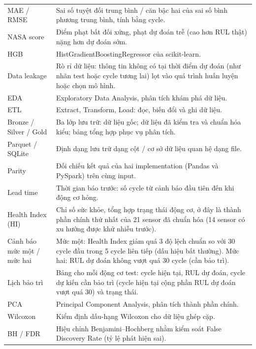 \begin{footnotesize}
\begin{longtable}{L{3.6cm}L{10.2cm}}
MAE / RMSE & Sai số tuyệt đối trung bình / căn bậc hai của sai số bình phương trung bình, tính bằng cycle.\\
NASA score & Điểm phạt bất đối xứng, phạt dự đoán trễ (cao hơn RUL thật) nặng hơn dự đoán sớm.\\
HGB & HistGradientBoostingRegressor của scikit-learn.\\
Data leakage & Rò rỉ dữ liệu: thông tin không có tại thời điểm dự đoán (như nhãn test hoặc cycle tương lai) lọt vào quá trình huấn luyện hoặc chọn mô hình.\\
EDA & Exploratory Data Analysis, phân tích khám phá dữ liệu.\\
ETL & Extract, Transform, Load: đọc, biến đổi và ghi dữ liệu.\\
Bronze / Silver / Gold & Ba lớp lưu trữ: dữ liệu gốc; dữ liệu đã kiểm tra và chuẩn hóa kiểu; bảng tổng hợp phục vụ phân tích.\\
Parquet / SQLite & Định dạng lưu trữ dạng cột / cơ sở dữ liệu quan hệ dạng file.\\
Parity & Đối chiếu kết quả của hai implementation (Pandas và PySpark) trên cùng input.\\
Lead time & Thời gian báo trước: số cycle từ cảnh báo đầu tiên đến khi động cơ hỏng.\\
Health Index (HI) & Chỉ số sức khỏe, tổng hợp trạng thái động cơ, ở đây là thành phần chính thứ nhất của 21 sensor đã chuẩn hóa (14 sensor có xu hướng được khử nhiễu trước).\\
Cảnh báo mức một / mức hai & Mức một: Health Index giảm quá 3 độ lệch chuẩn so với 30 cycle đầu trong 5 cycle liên tiếp (dấu hiệu bất thường). Mức hai: RUL dự đoán không vượt quá 30 cycle (cần bảo trì).\\
Lịch bảo trì & Bảng cho mỗi động cơ test: cycle hiện tại, RUL dự đoán, cycle dự kiến cần bảo trì (cycle hiện tại cộng phần RUL dự đoán vượt quá 30) và trạng thái.\\
PCA & Principal Component Analysis, phân tích thành phần chính.\\
Wilcoxon & Kiểm định dấu-hạng Wilcoxon cho dữ liệu ghép cặp.\\
BH / FDR & Hiệu chỉnh Benjamini--Hochberg nhằm kiểm soát False Discovery Rate (tỷ lệ phát hiện sai).\\

\end{longtable}
\addtocounter{table}{-1}
\end{footnotesize}
\clearpage
